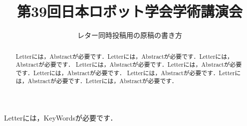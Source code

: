\documentclass[paper]{jrsj_UTF-8}
\title{第39回日本ロボット学会学術講演会}
\subtitle{レター同時投稿用の原稿の書き方}
\begin{document}
\begin{abstract}
  Letterには，Abstractが必要です．Letterには，Abstractが必要です．Letterには，Abstractが必要です．
  Letterには，Abstractが必要です．Letterには，Abstractが必要です．Letterには，Abstractが必要です．
  Letterには，Abstractが必要です．Letterには，Abstractが必要です．Letterには，Abstractが必要です．
\end{abstract}
\begin{keywords}
  Letterには，KeyWordsが必要です．
\end{keywords}
\maketitle



\end{document}
